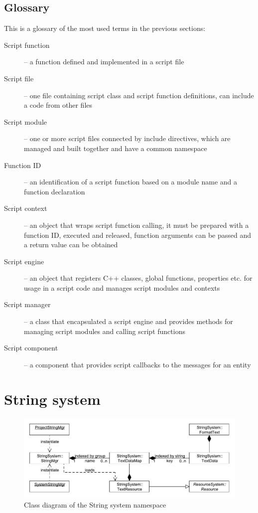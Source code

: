 \documentclass[a4paper, 12pt]{report}
\begin{document}
\section{Glossary}

This is a glossary of the most used terms in the previous sections:

\begin{description}
	\item[Script function] -- a function defined and implemented in a script file
	\item[Script file] -- one file containing script class and script function definitions, can include a code from other files
	\item[Script module] -- one or more script files connected by include directives, which are managed and built together and have a common namespace
	\item[Function ID] -- an identification of a script function based on a module name and a function declaration
	\item[Script context] -- an object that wraps script function calling, it must be prepared with a function ID, executed and released, function arguments can be passed and a return value can be obtained
	\item[Script engine] -- an object that registers C++ classes, global functions, properties etc. for usage in a script code and manages script modules and contexts
	\item[Script manager] -- a class that encapsulated a script engine and provides methods for managing script modules and calling script functions
	\item[Script component] -- a component that provides script callbacks to the messages for an entity
\end{description}


\chapter{String system}

\begin{figure}[htbp]
	\centering
		\includegraphics[width=1\textwidth]{StringSystemClassDiagram.pdf}
	\caption{Class diagram of the String system namespace}
	\label{fig:stringsystem-diagram}
\end{figure}
\end{document}
